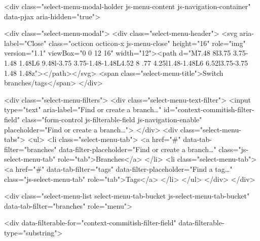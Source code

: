   <div class="select-menu-modal-holder js-menu-content js-navigation-container" data-pjax aria-hidden="true">

    <div class="select-menu-modal">
      <div class="select-menu-header">
        <svg aria-label="Close" class="octicon octicon-x js-menu-close" height="16" role="img" version="1.1" viewBox="0 0 12 16" width="12"><path d="M7.48 8l3.75 3.75-1.48 1.48L6 9.48l-3.75 3.75-1.48-1.48L4.52 8 .77 4.25l1.48-1.48L6 6.52l3.75-3.75 1.48 1.48z"></path></svg>
        <span class="select-menu-title">Switch branches/tags</span>
      </div>

      <div class="select-menu-filters">
        <div class="select-menu-text-filter">
          <input type="text" aria-label="Find or create a branch…" id="context-commitish-filter-field" class="form-control js-filterable-field js-navigation-enable" placeholder="Find or create a branch…">
        </div>
        <div class="select-menu-tabs">
          <ul>
            <li class="select-menu-tab">
              <a href="#" data-tab-filter="branches" data-filter-placeholder="Find or create a branch…" class="js-select-menu-tab" role="tab">Branches</a>
            </li>
            <li class="select-menu-tab">
              <a href="#" data-tab-filter="tags" data-filter-placeholder="Find a tag…" class="js-select-menu-tab" role="tab">Tags</a>
            </li>
          </ul>
        </div>
      </div>

      <div class="select-menu-list select-menu-tab-bucket js-select-menu-tab-bucket" data-tab-filter="branches" role="menu">

        <div data-filterable-for="context-commitish-filter-field" data-filterable-type="substring">


